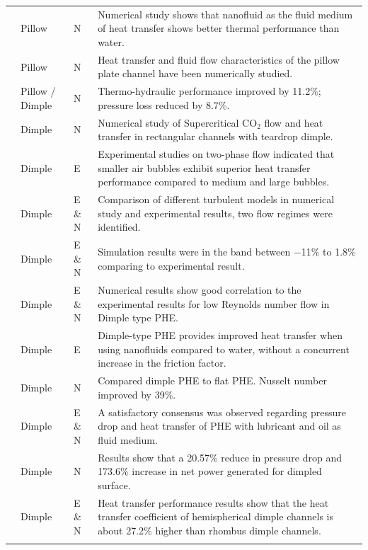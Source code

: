 \documentclass[review,12pt]{elsarticle}
\begin{document}
{\begin{longtable}{@{}>{\raggedright}p{2.6cm} >{\raggedright}p{1.6cm} >{\raggedright}p{1.6cm} >{\raggedright\arraybackslash}p{7.2cm}@{}}
\citet{shirzad2019b} & Pillow & N & Numerical study shows that nanofluid as the fluid medium of heat transfer shows better thermal performance than water. \\
\citet{kumar2019} & Pillow & N & Heat transfer and fluid flow characteristics of the pillow plate channel have been numerically studied. \\
\citet{piper2019} & Pillow / Dimple & N & Thermo-hydraulic performance improved by 11.2\%; pressure loss reduced by 8.7\%. \\
\citet{jing2019} & Dimple & N & Numerical study of Supercritical CO$_2$ flow and heat transfer in rectangular channels with teardrop dimple. \\
\citet{li2019} & Dimple & E & Experimental studies on two-phase flow indicated that smaller air bubbles exhibit superior heat transfer performance compared to medium and large bubbles. \\
\citet{mocnik2020} & Dimple & E \& N & Comparison of different turbulent models in numerical study and experimental results, two flow regimes were identified. \\
\citet{mocnik2023} & Dimple & E \& N & Simulation results were in the band between $-$11\% to 1.8\% comparing to experimental result. \\
\citet{mocnik2024} & Dimple & E \& N & Numerical results show good correlation to the experimental results for low Reynolds number flow in Dimple type PHE. \\
\citet{soman2019} & Dimple & E & Dimple-type PHE provides improved heat transfer when using nanofluids compared to water, without a concurrent increase in the friction factor. \\
\citet{soman2022} & Dimple & N & Compared dimple PHE to flat PHE. Nusselt number improved by 39\%. \\
\citet{torre2019} & Dimple & E \& N & A satisfactory consensus was observed regarding pressure drop and heat transfer of PHE with lubricant and oil as fluid medium. \\
\citet{wang2019} & Dimple & N & Results show that a 20.57\% reduce in pressure drop and 173.6\% increase in net power generated for dimpled surface. \\
\citet{ying2021} & Dimple & E \& N & Heat transfer performance results show that the heat transfer coefficient of hemispherical dimple channels is about 27.2\% higher than rhombus dimple channels. \\
\hline
\multicolumn{4}{l}{\textsuperscript{a}E -- Experimental; N -- Numerical.}
\end{longtable}
}
\end{document}
